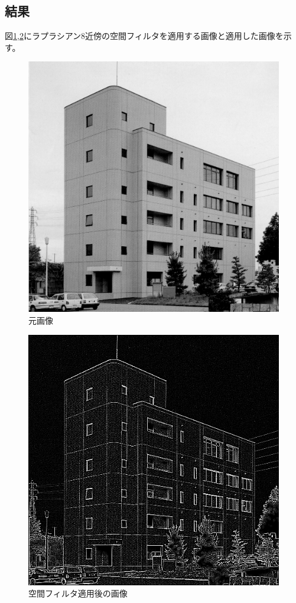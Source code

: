 \documentclass[11pt,a4paper,titlepage,dvipdfmx]{jarticle}
\begin{document}
  \subsection{結果}
    図\ref{fig:building-lap},\ref{fig:after-building-lap}にラプラシアン8近傍の空間フィルタを適用する画像と適用した画像を示す。
    \begin{figure}[H]
      \centering
      \includegraphics[scale=.8]{./building.bmp}
      \caption{元画像}
      \label{fig:building-lap}
    \end{figure} 
    \begin{figure}[H]
      \centering
      \includegraphics[scale=.8]{./laplacian-building.bmp}
      \caption{空間フィルタ適用後の画像}
      \label{fig:after-building-lap}
    \end{figure}  
  
\end{document}
